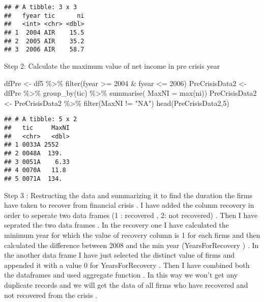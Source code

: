 \documentclass[
]{article}
\newenvironment{Shaded}{\begin{snugshade}}{\end{snugshade}}
\newcommand{\AttributeTok}[1]{\textcolor[rgb]{0.77,0.63,0.00}{#1}}
\newcommand{\DecValTok}[1]{\textcolor[rgb]{0.00,0.00,0.81}{#1}}
\newcommand{\FunctionTok}[1]{\textcolor[rgb]{0.00,0.00,0.00}{#1}}
\newcommand{\NormalTok}[1]{#1}
\newcommand{\OtherTok}[1]{\textcolor[rgb]{0.56,0.35,0.01}{#1}}
\newcommand{\SpecialCharTok}[1]{\textcolor[rgb]{0.00,0.00,0.00}{#1}}
\newcommand{\StringTok}[1]{\textcolor[rgb]{0.31,0.60,0.02}{#1}}
\begin{document}
\begin{verbatim}
## # A tibble: 3 x 3
##   fyear tic      ni
##   <int> <chr> <dbl>
## 1  2004 AIR    15.5
## 2  2005 AIR    35.2
## 3  2006 AIR    58.7
\end{verbatim}

Step 2: Calculate the maximum value of net income in pre crisis year

\begin{Shaded}
\begin{Highlighting}[]
\NormalTok{dfPre }\OtherTok{\textless{}{-}}\NormalTok{ df5 }\SpecialCharTok{\%\textgreater{}\%} \FunctionTok{filter}\NormalTok{(fyear }\SpecialCharTok{\textgreater{}=} \DecValTok{2004} \SpecialCharTok{\&}\NormalTok{ fyear }\SpecialCharTok{\textless{}=} \DecValTok{2006}\NormalTok{)}
\NormalTok{PreCrisisData2  }\OtherTok{\textless{}{-}}\NormalTok{ dfPre }\SpecialCharTok{\%\textgreater{}\%} \FunctionTok{group\_by}\NormalTok{(tic) }\SpecialCharTok{\%\textgreater{}\%} \FunctionTok{summarise}\NormalTok{( }\AttributeTok{MaxNI =} \FunctionTok{max}\NormalTok{(ni))}
\NormalTok{PreCrisisData2 }\OtherTok{\textless{}{-}}\NormalTok{ PreCrisisData2 }\SpecialCharTok{\%\textgreater{}\%} \FunctionTok{filter}\NormalTok{(MaxNI }\SpecialCharTok{!=} \StringTok{"NA"}\NormalTok{)}
\FunctionTok{head}\NormalTok{(PreCrisisData2,}\DecValTok{5}\NormalTok{)}
\end{Highlighting}
\end{Shaded}

\begin{verbatim}
## # A tibble: 5 x 2
##   tic     MaxNI
##   <chr>   <dbl>
## 1 0033A 2552   
## 2 0048A  139.  
## 3 0051A    6.33
## 4 0070A   11.8 
## 5 0071A  134.
\end{verbatim}

Step 3 : Restructing the data and summarizing it to find the duration
the firms have taken to recover from financial crisis . I have added the
column recovery in order to seperate two data frames (1 : recovered , 2:
not recovered) . Then I have seprated the two data frames . In the
recovery one I have calculated the minimum year for which the value of
recovery column is 1 for each firms and then calculated the difference
between 2008 and the min year (YearsForRecovery ) . In the another data
frame I have just selected the distinct value of firms and appended it
with a value 0 for YearsForRecovery . Then I have combined both the
dataframes and used aggregate function . In this way we won't get any
duplicate records and we will get the data of all firms who have
recovered and not recovered from the crisis .
\end{document}
